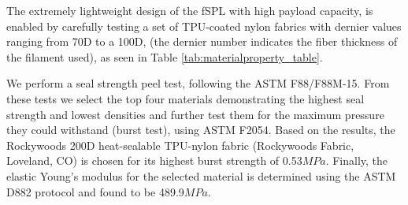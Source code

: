 \documentclass[letterpaper, 10 pt, conference]{ieeeconf}  %
\begin{document}
The extremely lightweight design of the fSPL with high payload capacity, is enabled by carefully testing a set of TPU-coated nylon fabrics with dernier values ranging from 70D to a 100D, (the dernier number indicates the fiber thickness of the filament used), as seen in Table \ref{tab:materialproperty_table}. 

We perform a seal strength peel test, following the ASTM F88/F88M-15. From these tests we select the top four materials demonstrating the highest seal strength and lowest densities %
% 
% 
and further test them for the maximum pressure they could withstand (burst test), using ASTM F2054. Based on the results, the Rockywoods 200D heat-sealable TPU-nylon fabric (Rockywoods Fabric, Loveland, CO) is chosen for its highest burst strength of 0.53$MPa$. Finally, the elastic Young's modulus for the selected material is determined using the ASTM D882 protocol and found to be 489.9$MPa$.


\end{document}
